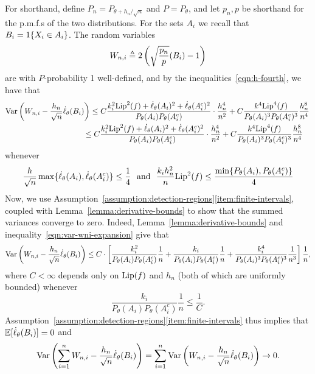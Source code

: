 For shorthand, define $P_n = P_{\theta + h_n / \sqrt{n}}$ and $P =
P_\theta$, and let $p_n, p$ be shorthand for the p.m.f.s of the two
distributions.  For the sets $A_i$ we recall that $B_i = 1\!\left\{X_i \in
  A_i\right\}$.  The random variables
\begin{equation*}
  W_{n,i} \triangleq 2 \left(\sqrt{\frac{p_n}{p}}(B_i) - 1\right)
\end{equation*}
are with $P$-probability 1 well-defined, and by the
inequalities~\eqref{eqn:h-fourth}, we have
that
\begin{align}
  \lefteqn{\var\left(W_{n,i} - \frac{h_n}{\sqrt{n}} \score_\theta(B_i)\right)
    \le 
    C \frac{k_i^2 \lip^2(f) + \score_\theta(A_i)^2
      + \score_\theta(A_i^c)^2}{P_\theta(A_i) P_\theta(A_i^c)}
    \cdot \frac{h_n^4}{n^2}
    + C \frac{k^4 \lip^4(f)}{
      P_\theta(A_i)^3 P_\theta(A_i^c)^3}
    \frac{h_n^8}{n^4}} \nonumber \\
  & \qquad\qquad\qquad\qquad\qquad \le 
  C \frac{k_i^2 \lip^2(f) + \score_\theta(A_i)^2
  + \score_\theta(A_i^c)^2}{P_\theta(A_i) P_\theta(A_i^c)}
  \cdot \frac{h_n^4}{n^2}
  + C \frac{k^4 \lip^4(f)}{
    P_\theta(A_i)^3 P_\theta(A_i^c)^3}
  \frac{h_n^8}{n^4}
  \label{eqn:var-wni-expansion}
\end{align}
whenever
\begin{equation*}
  \frac{h}{\sqrt{n}} \max\{\dot{\ell}_\theta(A_i),
  \dot{\ell}_\theta(A_i^c)\}
  \le \frac{1}{4}
  ~~ \mbox{and} ~~
  \frac{k_i h_n^2}{n} {\rm \textup{Lip}}^2(f)
  \le \frac{\min\{P_\theta(A_i), P_\theta(A_i^c)\}}{4}
\end{equation*}
Now, we use
Assumption~\ref{assumption:detection-regions}\eqref{item:finite-intervals},
coupled with Lemma~\ref{lemma:derivative-bounds} to show that the summed
variances converge to zero.  Indeed, Lemma~\ref{lemma:derivative-bounds} and
inequality~\eqref{eqn:var-wni-expansion} give that
\begin{equation*}
  \textup{Var}\left(W_{n,i} - \frac{h_n}{\sqrt{n}} \dot{\ell}_\theta(B_i)\right)
  \le C \cdot
  \left[\frac{k_i^2}{P_\theta(A_i) P_\theta(A_i^c)}
    \frac{1}{n}
    + \frac{k_i}{P_\theta(A_i) P_\theta(A_i^c)}
    \frac{1}{n}
    + \frac{k_i^4}{P_\theta(A_i)^3 P_\theta(A_i^c)^3}
    \frac{1}{n^3}\right] \frac{1}{n},
\end{equation*}
where $C < \infty$ depends only on ${\rm \textup{Lip}}(f)$ and $h_n$ (both of which are
uniformly bounded) whenever
\begin{equation*}
  \frac{k_i}{P_\theta(A_i) P_\theta(A_i^c)} \frac{1}{n} \le
  \frac{1}{C}.
\end{equation*}
Assumption~\ref{assumption:detection-regions}\eqref{item:finite-intervals}
thus implies that $\mathbb{E}[\dot{\ell}_\theta(B_i)] = 0$ and
\begin{equation}
  \label{eqn:summed-variances-to-zero}
  \textup{Var}\left(\sum_{i = 1}^n W_{n,i} - \frac{h_n}{\sqrt{n}} \dot{\ell}_\theta(B_i)
  \right)
  = \sum_{i = 1}^n \textup{Var}\left(W_{n,i} - \frac{h_n}{\sqrt{n}} \dot{\ell}_\theta(B_i)
  \right)
  \to 0.
\end{equation}


